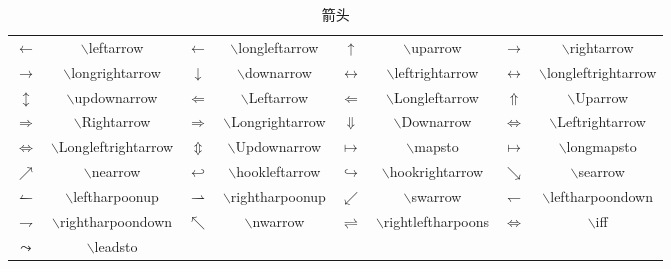 \documentclass[UTF8]{ctexart}
\begin{document}
\begin{table}[H]
	\begin{center}
		\caption{箭头}
		\begin{tabular}{cccccccc}
			
			
			$\leftarrow$  &  $\backslash$leftarrow  &  $\longleftarrow$  & $\backslash$longleftarrow  &  $\uparrow$  & $\backslash$uparrow  &  $\rightarrow$  &  $\backslash$rightarrow \\
			
			$\longrightarrow$ & $\backslash$longrightarrow &  $\downarrow$  & $\backslash$downarrow   &  $\leftrightarrow$  & $\backslash$leftrightarrow &  $\longleftrightarrow$ & $\backslash$longleftrightarrow \\
			
			
			$\updownarrow$  &  $\backslash$updownarrow  &  $\Leftarrow$  & $\backslash$Leftarrow  &  $\Longleftarrow$  & $\backslash$Longleftarrow  &  $\Uparrow$  &  $\backslash$Uparrow \\
			
			$\Rightarrow$ & $\backslash$Rightarrow &  $\Longrightarrow$  & $\backslash$Longrightarrow   &  $\Downarrow$  & $\backslash$Downarrow &  $\Leftrightarrow$ & $\backslash$Leftrightarrow \\
			
			$\Longleftrightarrow$ & $\backslash$Longleftrightarrow &  $\Updownarrow$  & $\backslash$Updownarrow   &  $\mapsto$  & $\backslash$mapsto &  $\longmapsto$ & $\backslash$longmapsto \\	

			$\nearrow$ & $\backslash$nearrow &  $\hookleftarrow$  & $\backslash$hookleftarrow   &  $\hookrightarrow$  & $\backslash$hookrightarrow &  $\searrow$ & $\backslash$searrow \\

			$\leftharpoonup$ & $\backslash$leftharpoonup &  $\rightharpoonup$  & $\backslash$rightharpoonup   &  $\swarrow$  & $\backslash$swarrow &  $\leftharpoondown$ & $\backslash$leftharpoondown \\


			$\rightharpoondown$ & $\backslash$rightharpoondown &  $\nwarrow$  & $\backslash$nwarrow   &  $\rightleftharpoons$  & $\backslash$rightleftharpoons &  $\iff$ & $\backslash$iff \\

			$\leadsto$ & $\backslash$leadsto \\

			
		\end{tabular}
	\end{center}
\end{table}
\end{document}
